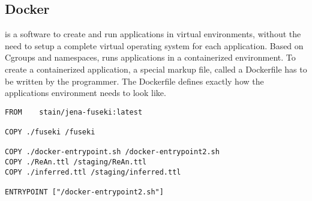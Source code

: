 
\subsection{Docker}
\docker{} is a software to create and run applications in virtual environments, without the need to setup a complete virtual operating system for each application. Based on Cgroups and namespaces, \docker{} runs applications in a containerized environment.
To create a containerized application, a special markup file, called a Dockerfile has to be written by the programmer. The Dockerfile defines exactly how the applications environment needs to look like.



\begin{lstlisting}[style=YAML,caption=hiho]
FROM	stain/jena-fuseki:latest

COPY ./fuseki /fuseki

COPY ./docker-entrypoint.sh /docker-entrypoint2.sh
COPY ./ReAn.ttl /staging/ReAn.ttl
COPY ./inferred.ttl /staging/inferred.ttl

ENTRYPOINT ["/docker-entrypoint2.sh"]
\end{lstlisting}
